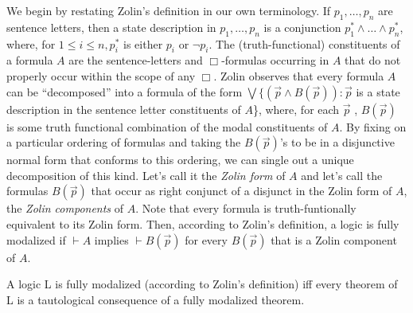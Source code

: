 We begin by restating Zolin's definition in our own terminology. If $p_1,{\ldots},p_n$ are sentence letters, then a state description in ${p_1,{\ldots},p_n}$ is a conjunction $p_1^*\wedge {\ldots}\wedge p_n^*$, where, for $1\le i\le n, p_i^*$ is either $p_i$ or $\neg p_i$. The (truth-functional) constituents of a formula $A$ are the sentence-letters and $\Box $-formulas occurring in $A$ that do not properly occur within the scope of any $\Box $. Zolin observes that every formula $A$ can be ``decomposed'' into a formula of the form ${\bigvee}\{(\vec{p}\wedge B(\vec{p}))\!:\vec{p}$ is a state description in the sentence letter constituents of $A$\}, where, for each $\vec{p}$ , $B(\vec{p})$ is some truth functional combination of the modal constituents of $A$. By fixing on a particular ordering of formulas and taking the $B(\vec{p})$'s to be in a disjunctive normal form that conforms to this ordering, we can single out a unique decomposition of this kind. Let's call it the \textit{Zolin form} of $A$ and let's call the formulas $B(\vec{p})$ that occur as right conjunct of a disjunct in the Zolin form of $A$, the \textit{Zolin components} of $A$. Note that every formula is truth-funtionally equivalent to its Zolin form. Then, according to Zolin's definition, a logic is fully modalized if $\vdash A$ implies $\vdash B(\vec{p})$ for every $B(\vec{p})$ that is a Zolin component of $A$. 
\renewcommand\qedsymbol{$\blacksquare$}
\begin{theorem}
A logic L is fully modalized (according to Zolin's definition) iff every theorem of L is a tautological consequence of a fully modalized theorem.
\end{theorem}

